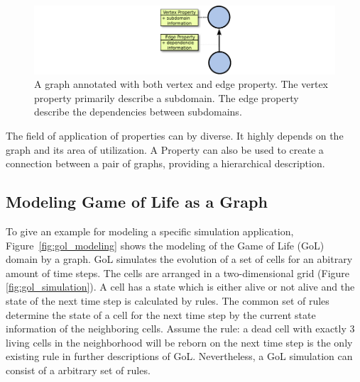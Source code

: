 \begin{figure}[H]
  \centering \includegraphics[width=\textwidth]{graphics/30_property}
  \caption{A graph annotated with both vertex and edge property. The vertex
    property primarily describe a subdomain. The edge property
    describe the dependencies between subdomains.}
  \label{fig:property}
\end{figure}

\noindent The field of application of properties can by diverse. It highly
depends on the graph and its area of utilization.  A Property can also
be used to create a connection between a pair of graphs, providing a
hierarchical description.



\subsection{Modeling Game of Life as a Graph}
\label{sec:gol}
To give an example for modeling a specific simulation application,
Figure~\ref{fig:gol_modeling} shows the modeling of the Game of Life
(GoL)~\cite{ref:gol} domain by a graph. GoL simulates the evolution of
a set of cells for an abitrary amount of time steps. The cells are
arranged in a two-dimensional grid (Figure \ref{fig:gol_simulation}).
A cell has a state which is either alive or not alive and the state of
the next time step is calculated by rules.  The common set of rules
determine the state of a cell for the next time step by the current
state information of the neighboring cells.  Assume the rule: a dead
cell with exactly 3 living cells in the neighborhood will be reborn on
the next time step is the only existing rule in further descriptions
of GoL.  Nevertheless, a GoL simulation can consist of a arbitrary set
of rules.

